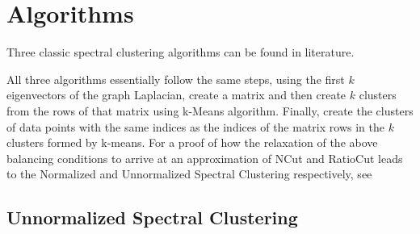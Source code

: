 \documentclass[10pt,a4paper, nocenter]{report}
\begin{document}
    \section{Algorithms}

    Three classic spectral clustering algorithms can be found in literature.

    All three algorithms essentially follow the same steps, using the first $k$ eigenvectors of the graph Laplacian, create a matrix and then create $k$ clusters from the rows of that matrix using k-Means algorithm. Finally, create the clusters of data points with the same indices as the indices of the matrix rows in the $k$ clusters formed by k-means. For a proof of how the relaxation of the above balancing conditions to arrive at an approximation of NCut and RatioCut leads to the Normalized and Unnormalized Spectral Clustering respectively, see \cite{Luxburg2007}
	
	\subsection{Unnormalized Spectral Clustering}
    \begin{algorithm}
        \DontPrintSemicolon
    \end{algorithm}
\end{document}
